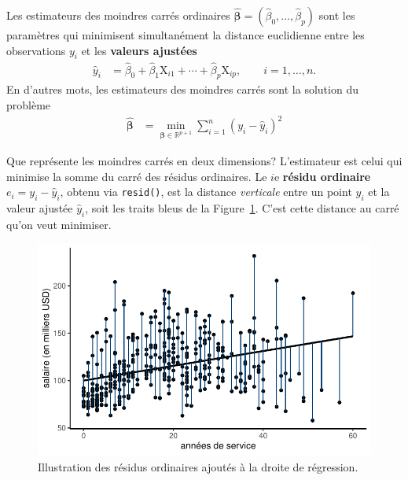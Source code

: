 \documentclass[
  11pt,
  letterpaper,
]{scrbook}
\theoremstyle{definition}
\theoremstyle{remark}
\begin{document}
Les estimateurs des moindres carrés ordinaires
\(\widehat{\boldsymbol{\beta}}=(\widehat{\beta}_0, \ldots, \widehat{\beta}_p)\)
sont les paramètres qui minimisent simultanément la distance euclidienne
entre les observations \(y_i\) et les \textbf{valeurs ajustées}
\begin{align*}
\widehat{y}_i &= \widehat{\beta}_0 + \widehat{\beta}_1 \mathrm{X}_{i1} + \cdots + \widehat{\beta}_p \mathrm{X}_{ip}, \qquad i =1, \ldots, n.
\end{align*} En d'autres mots, les estimateurs des moindres carrés sont
la solution du problème \begin{align*}
\widehat{\boldsymbol{\beta}} &=\min_{\boldsymbol{\beta} \in \mathbb{R}^{p+1}}\sum_{i=1}^n (y_i-\widehat{y}_i)^2
\end{align*}

Que représente les moindres carrés en deux dimensions? L'estimateur est
celui qui minimise la somme du carré des résidus ordinaires. Le \(i\)e
\textbf{résidu ordinaire} \(e_i = y_i -\widehat{y}_i\), obtenu via
\texttt{resid()}, est la distance \emph{verticale} entre un point
\(y_i\) et la valeur ajustée \(\widehat{y}_i\), soit les traits bleus de
la Figure~\ref{fig-distancevert}. C'est cette distance au carré qu'on
veut minimiser.

\begin{figure}[ht!]

{\centering \includegraphics{rappel-regressionlineaire_files/figure-pdf/fig-distancevert-1.pdf}

}

\caption{\label{fig-distancevert}Illustration des résidus ordinaires
ajoutés à la droite de régression.}

\end{figure}
\end{document}

